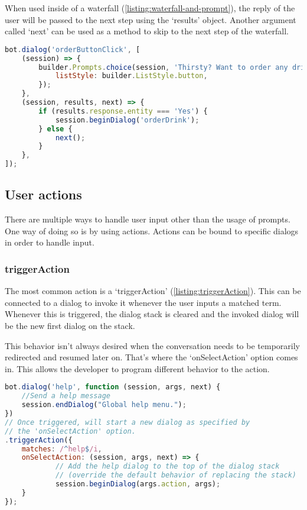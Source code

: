 When used inside of a waterfall (\ref{listing:waterfall-and-prompt}), the reply of the user will be passed to the next step using the `results' object. Another argument called `next' can be used as a method to skip to the next step of the waterfall.

\begin{lstlisting}[language=JavaScript,caption={2-step waterfall using a prompt},label=listing:waterfall-and-prompt]
bot.dialog('orderButtonClick', [
	(session) => {
		builder.Prompts.choice(session, 'Thirsty? Want to order any drinks?', 'Yes|No drinks', {
			listStyle: builder.ListStyle.button,
		});
	},
	(session, results, next) => {
		if (results.response.entity === 'Yes') {
			session.beginDialog('orderDrink');
		} else {
			next();
		}
	},
]);
\end{lstlisting}

\subsection{User actions}

There are multiple ways to handle user input other than the usage of prompts. One way of doing so is by using actions. Actions can be bound to specific dialogs in order to handle input.

\subsubsection{triggerAction}

The most common action is a `triggerAction' (\ref{listing:triggerAction}). This can be connected to a dialog to invoke it whenever the user inputs a matched term. Whenever this is triggered, the dialog stack is cleared and the invoked dialog will be the new first dialog on the stack.

This behavior isn't always desired when the conversation needs to be temporarily redirected and resumed later on. That's where the `onSelectAction' option comes in. This allows the developer to program different behavior to the action.

\begin{lstlisting}[language=JavaScript,caption={triggerAction being bound to a dialog and its behavior overwritten by onSelectAction},label=listing:triggerAction]
bot.dialog('help', function (session, args, next) {
	//Send a help message
	session.endDialog("Global help menu.");
})
// Once triggered, will start a new dialog as specified by
// the 'onSelectAction' option.
.triggerAction({
	matches: /^help$/i,
	onSelectAction: (session, args, next) => {
			// Add the help dialog to the top of the dialog stack 
			// (override the default behavior of replacing the stack)
			session.beginDialog(args.action, args);
	}
});
\end{lstlisting}

